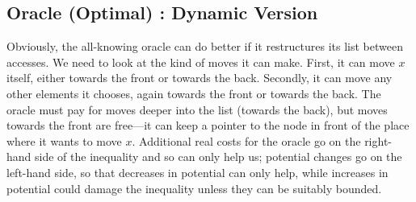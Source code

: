 \documentclass{article}
\begin{document}
\subsection{Oracle (Optimal) : Dynamic Version}
\label{sec;dynamic}
Obviously, the all-knowing oracle can do better if it restructures its list
between accesses.  We need to look at the kind of moves it can make.
First, it can move $x$ itself, either towards the front or towards the back.
Secondly, it can move any other elements it chooses, again towards the front
or towards the back.  The oracle must pay for moves deeper into the list
(towards the back), but moves towards the front are free---it can keep
a pointer to the node in front of the place where it wants to move $x$.
Additional real costs for the oracle go on the right-hand side of the
inequality and so can only help us; potential changes go on the left-hand
side, so that decreases in potential can only help, while increases in
potential could damage the inequality unless they can be suitably bounded.
\end{document}
